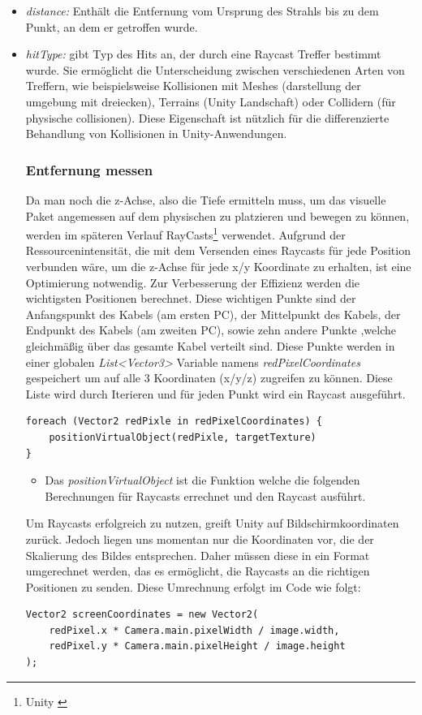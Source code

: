 \begin{itemize}
    \item \textit{distance: } Enthält die Entfernung vom Ursprung des Strahls bis zu dem Punkt, an dem er getroffen wurde.
    \item \textit{hitType: } gibt Typ des Hits an, der durch eine Raycast Treffer bestimmt wurde. Sie ermöglicht die Unterscheidung zwischen verschiedenen Arten von Treffern, wie beispielsweise Kollisionen mit Meshes (darstellung der umgebung mit dreiecken), Terrains (Unity Landschaft) oder Collidern (für physische collisionen). Diese Eigenschaft ist nützlich für die differenzierte Behandlung von Kollisionen in Unity-Anwendungen.
    \subsubsection{Entfernung messen}
    Da man noch die z-Achse, also die Tiefe ermitteln muss, um das visuelle Paket angemessen auf dem physischen zu platzieren und bewegen zu können, werden
    im späteren Verlauf RayCasts\protect\footnote{Unity \cite{Raycast}} verwendet. Aufgrund der Ressourcenintensität, die mit dem Versenden eines Raycasts
    für jede Position verbunden wäre, um die z-Achse für jede x/y Koordinate zu erhalten, ist eine Optimierung notwendig.
    Zur Verbesserung der Effizienz werden die wichtigsten Positionen berechnet. Diese wichtigen Punkte sind der
    Anfangspunkt des Kabels (am ersten PC), der Mittelpunkt des Kabels, der Endpunkt des Kabels (am zweiten PC), sowie zehn andere Punkte ,welche gleichmäßig über das gesamte Kabel verteilt sind. Diese Punkte werden in einer globalen \textit{List<Vector3>} Variable namens \textit{redPixelCoordinates} gespeichert um auf alle 3 Koordinaten (x/y/z) zugreifen zu können. Diese Liste wird durch Iterieren und für jeden Punkt wird ein Raycast ausgeführt.
    \begin{lstlisting}[style=csharp, caption={Iteration durch die Liste der Raycastpunkte}, label=code:]
foreach (Vector2 redPixle in redPixelCoordinates) {
    positionVirtualObject(redPixle, targetTexture)
}
    \end{lstlisting}
    \begin{itemize}
        \item Das \textit{positionVirtualObject} ist die Funktion welche die folgenden Berechnungen für Raycasts errechnet und den Raycast ausführt. \\
    \end{itemize}
    Um Raycasts erfolgreich zu nutzen, greift Unity auf Bildschirmkoordinaten zurück. Jedoch liegen uns momentan nur die Koordinaten vor, die der Skalierung des Bildes entsprechen. Daher müssen diese in ein Format umgerechnet werden, das es ermöglicht, die Raycasts an die richtigen Positionen zu senden. Diese Umrechnung erfolgt im Code wie folgt:
    \begin{lstlisting}[style=csharp, caption={Koordinaten Umrechnung}, label=code:Coordinates calculations]
Vector2 screenCoordinates = new Vector2(
    redPixel.x * Camera.main.pixelWidth / image.width,
    redPixel.y * Camera.main.pixelHeight / image.height
);
    \end{lstlisting}


\end{itemize}
